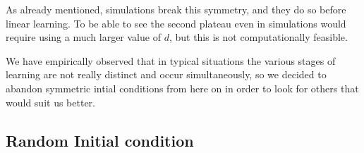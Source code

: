 As already mentioned, simulations break this symmetry, and they do so before linear learning.
To be able to see the second plateau even in simulations would require using a much larger value of \(d\),
but this is not computationally feasible. 

We have empirically observed that in typical situations the various stages of learning are not really distinct and occur simultaneously,
so we decided to abandon symmetric intial conditions from here on in order to look for others that would suit us better.


\subsection{Random Initial condition}
